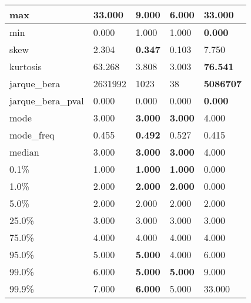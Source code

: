 \begin{table}[H]
\begin{tabular}{|l|m{10em}|m{10em}|m{10em}|m{10em}|}
\hline max & 33.000 & 9.000 & \cellcolor[rgb]{0.9, 0.54, 0.52} 6.000 & \bfseries 33.000 \\
\hline min & 0.000 & \cellcolor[rgb]{0.9, 0.54, 0.52} 1.000 & \cellcolor[rgb]{0.9, 0.54, 0.52} 1.000 & \bfseries 0.000 \\
\hline skew & 2.304 & \bfseries 0.347 & 0.103 & \cellcolor[rgb]{0.9, 0.54, 0.52} 7.750 \\
\hline kurtosis & 63.268 & 3.808 & \cellcolor[rgb]{0.9, 0.54, 0.52} 3.003 & \bfseries 76.541 \\
\hline jarque\_bera & 2631992 & 1023 & \cellcolor[rgb]{0.9, 0.54, 0.52} 38 & \bfseries 5086707 \\
\hline jarque\_bera\_pval & 0.000 & 0.000 & \cellcolor[rgb]{0.9, 0.54, 0.52} 0.000 & \bfseries 0.000 \\
\hline mode & 3.000 & \bfseries 3.000 & \bfseries 3.000 & \cellcolor[rgb]{0.9, 0.54, 0.52} 4.000 \\
\hline mode\_freq & 0.455 & \bfseries 0.492 & \cellcolor[rgb]{0.9, 0.54, 0.52} 0.527 & 0.415 \\
\hline median & 3.000 & \bfseries 3.000 & \bfseries 3.000 & \cellcolor[rgb]{0.9, 0.54, 0.52} 4.000 \\
\hline 0.1\% & 1.000 & \bfseries 1.000 & \bfseries 1.000 & \cellcolor[rgb]{0.9, 0.54, 0.52} 0.000 \\
\hline 1.0\% & 2.000 & \bfseries 2.000 & \bfseries 2.000 & \cellcolor[rgb]{0.9, 0.54, 0.52} 0.000 \\
\hline 5.0\% & 2.000 & 2.000 & 2.000 & 2.000 \\
\hline 25.0\% & 3.000 & 3.000 & 3.000 & 3.000 \\
\hline 75.0\% & 4.000 & 4.000 & 4.000 & 4.000 \\
\hline 95.0\% & 5.000 & \bfseries 5.000 & \cellcolor[rgb]{0.9, 0.54, 0.52} 4.000 & \cellcolor[rgb]{0.9, 0.54, 0.52} 6.000 \\
\hline 99.0\% & 6.000 & \bfseries 5.000 & \bfseries 5.000 & \cellcolor[rgb]{0.9, 0.54, 0.52} 9.000 \\
\hline 99.9\% & 7.000 & \bfseries 6.000 & 5.000 & \cellcolor[rgb]{0.9, 0.54, 0.52} 33.000 \\
\hline
\end{tabular}
\end{table}

